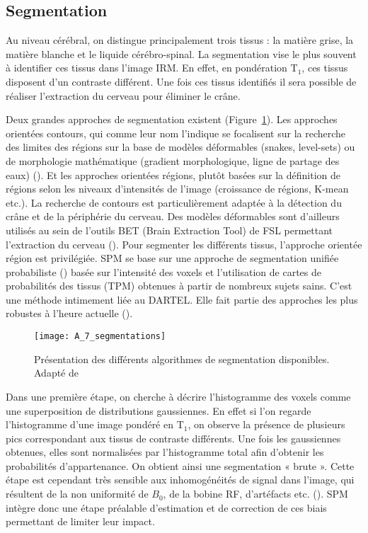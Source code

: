 \subsection{Segmentation}
Au niveau cérébral, on distingue principalement trois tissus : la matière grise, la matière
blanche et le liquide cérébro-spinal. La segmentation vise le plus souvent à identifier ces tissus dans
l’image IRM. En effet, en pondération T$_1$, ces tissus disposent d’un contraste différent. Une fois ces
tissus identifiés il sera possible de réaliser l’extraction du cerveau pour éliminer le crâne.

Deux grandes approches de segmentation existent (Figure~\ref{fig:A_7_segmentations}). Les approches orientées
contours, qui comme leur nom l’indique se focalisent sur la recherche des limites des régions sur la
base de modèles déformables (snakes, level-sets) ou de morphologie mathématique (gradient morphologique, ligne de partage des eaux) (\cite{Scherrer2008}). Et les approches orientées régions, plutôt basées
sur la définition de régions selon les niveaux d’intensités de l’image (croissance de régions, K-mean
etc.). La recherche de contours est particulièrement adaptée à la détection du crâne et de la périphérie
du cerveau. Des modèles déformables sont d’ailleurs utilisés au sein de l’outils BET (Brain Extraction
Tool) de FSL permettant l’extraction du cerveau (\cite{Smith2002}). Pour segmenter les différents tissus, l’approche
orientée région est privilégiée. SPM se base sur une approche de segmentation unifiée probabiliste
(\cite{Ashburner2005}) basée sur l’intensité des voxels et l’utilisation de cartes de probabilités des tissus (TPM) obtenues
à partir de nombreux sujets sains. C’est une méthode intimement liée au DARTEL. Elle fait partie des
approches les plus robustes à l’heure actuelle (\cite{Malone2015}). 
\begin{figure}[!t]
\centering
\texttt{[image: A\_7\_segmentations]}
\caption{Présentation des différents algorithmes de segmentation disponibles. Adapté de \cite{Scherrer2008}}
\label{fig:A_7_segmentations}	
\end{figure}
Dans une première étape, on cherche à décrire
l’histogramme des voxels comme une superposition de distributions gaussiennes. En effet si l’on
regarde l’histogramme d’une image pondéré en T$_1$, on observe la présence de plusieurs pics
correspondant aux tissus de contraste différents. Une fois les gaussiennes obtenues, elles sont
normalisées par l’histogramme total afin d’obtenir les probabilités d’appartenance. On obtient ainsi
une segmentation « brute ». Cette étape est cependant très sensible aux inhomogénéités de signal
dans l’image, qui résultent de la non uniformité de $B_0$, de la bobine RF, d’artéfacts etc. (\cite{Kwan1999}). SPM
intègre donc une étape préalable d’estimation et de correction de ces biais permettant de limiter leur
impact.

